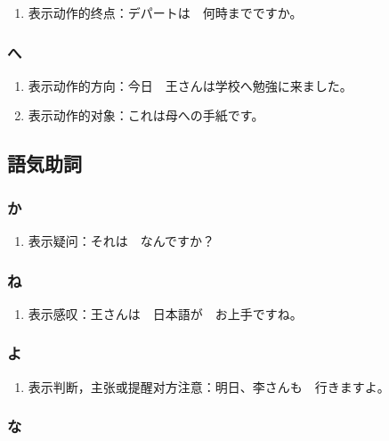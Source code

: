 \begin{enumerate}
  \item 表示动作的终点：デパートは　何時までですか。
\end{enumerate}


\subsubsection{へ}%

\begin{enumerate}
  \item 表示动作的方向：今日　王さんは学校へ勉強に来ました。
  \item 表示动作的对象：これは母への手紙です。
\end{enumerate}



\subsection{語気助詞}%

\subsubsection{か}%

\begin{enumerate}
  \item 表示疑问：それは　なんですか？
\end{enumerate}


\subsubsection{ね}%

\begin{enumerate}
  \item 表示感叹：王さんは　日本語が　お上手ですね。
\end{enumerate}


\subsubsection{よ}%

\begin{enumerate}
  \item 表示判断，主张或提醒对方注意：明日、李さんも　行きますよ。
\end{enumerate}


\subsubsection{な}%


